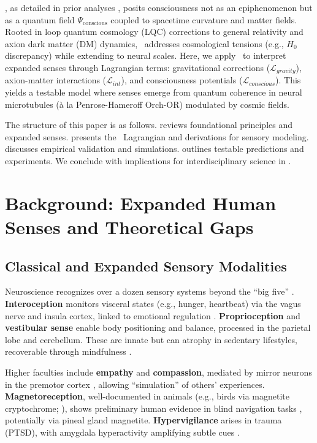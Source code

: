 \documentclass[11pt,a4paper,preprint]{article}
\newcommand{\uqcmf}{\mathrm{UQCMF}}
\newcommand{\Psicon}{\Psi_{\mathrm{conscious}}}
\newcommand{\La}{\mathcal{L}}
\begin{document}
\uqcmf, as detailed in prior analyses \citep{heidari2025a, heidari2025b}, posits consciousness not as an epiphenomenon but as a quantum field $\Psicon$ coupled to spacetime curvature and matter fields. Rooted in loop quantum cosmology (LQC) corrections to general relativity and axion dark matter (DM) dynamics, \uqcmf\ addresses cosmological tensions (e.g., $H_0$ discrepancy) while extending to neural scales. Here, we apply \uqcmf\ to interpret expanded senses through Lagrangian terms: gravitational corrections ($\La_{gravity}$), axion-matter interactions ($\La_{int}$), and consciousness potentials ($\La_{conscious}$). This yields a testable model where senses emerge from quantum coherence in neural microtubules (à la Penrose-Hameroff Orch-OR) modulated by cosmic fields.

The structure of this paper is as follows.  reviews foundational principles and expanded senses.  presents the \uqcmf\ Lagrangian and derivations for sensory modeling.  discusses empirical validation and simulations.  outlines testable predictions and experiments. We conclude with implications for interdisciplinary science in .

\section{Background: Expanded Human Senses and Theoretical Gaps}\label{sec:background}

\subsection{Classical and Expanded Sensory Modalities}

Neuroscience recognizes over a dozen sensory systems beyond the ``big five'' \citep{ackerman1990}. \textbf{Interoception} monitors visceral states (e.g., hunger, heartbeat) via the vagus nerve and insula cortex, linked to emotional regulation \citep{craig2009}. \textbf{Proprioception} and \textbf{vestibular sense} enable body positioning and balance, processed in the parietal lobe and cerebellum. These are innate but can atrophy in sedentary lifestyles, recoverable through mindfulness \citep{farb2013}.

Higher faculties include \textbf{empathy} and \textbf{compassion}, mediated by mirror neurons in the premotor cortex \citep{rizzolatti2004}, allowing ``simulation'' of others' experiences. \textbf{Magnetoreception}, well-documented in animals (e.g., birds via magnetite cryptochrome; \citealt{wiltschko2005}), shows preliminary human evidence in blind navigation tasks \citep{baker1980}, potentially via pineal gland magnetite. \textbf{Hypervigilance} arises in trauma (PTSD), with amygdala hyperactivity amplifying subtle cues \citep{shin2006}.
\end{document}
